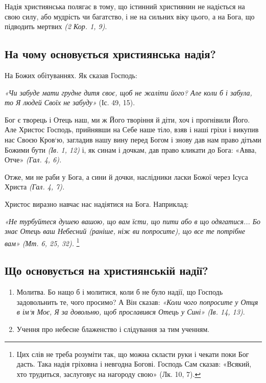 \documentclass[main.tex]{subfiles}
\begin{document}
Надія християнська полягає в тому, що істинний християнин не надіється на свою силу, або мудрість чи багатство, і не на сильних віку цього, а на Бога, що підводить мертвих \emph{(2 Кор. 1, 9)}.
\subsection{На чому основується християнська надія?}
На Божих обітуваннях. Як сказав Господь:

\begin{FlushRight}
    \emph{\color{red}«Чи забуде мати грудне дитя своє, щоб не жаліти його? Але коли б і забула, то Я людей Своїх не забуду»} (Іс. 49, 15).
\end{FlushRight}

Бог є творець і Отець наш, ми ж Його творіння й діти, хоч і прогнівили Його. Але Христос Господь, прийнявши на Себе наше тіло, взяв і наші гріхи і викупив нас Своєю Кров`ю, загладив нашу вину перед Богом і знову дав нам право дітьми Божими бути \emph{(Ів. 1, 12)} і, як синам і дочкам, дав право кликати до Бога: «Авва, Отче» \emph{(Гал. 4, 6).}

Отже, ми не раби у Бога, а сини й дочки, наслідники ласки Божої через Ісуса Христа \emph{(Гал. 4, 7).}

Христос виразно навчає нас надіятися на Бога. Наприклад:

\begin{FlushRight}
   \emph{{\color{red} «Не турбуйтеся душею вашою, що вам їсти, що пити або в що одягатися... Бо знає Отець ваш Небесний} (раніше, ніж ви попросите){\color{red}, що все те потрібне вам»} (Мт. 6, 25, 32).}
   \footnote{Цих слів не треба розуміти так, що можна скласти руки і чекати поки Бог дасть. Така надія гріховна і невгодна Богові. Господь Сам сказав: {\color{red} «Всякий, хто трудиться, заслуговує на нагороду свою»} (Лк. 10, 7).}
\end{FlushRight}


\subsection{Що основується на християнській надії?}
\begin{enumerate}
\item Молитва. Бо нащо б і молитися, коли б не було надії, що Господь задовольнить те, чого просимо? А Він сказав: \emph{{\color{red}«Коли чого попросите у Отця в ім`я Моє, Я за довольню, щоб прославився Отець у Сині»} (Ів. 14, 13)}.
\item Учення про небесне блаженство і слідування за тим ученням.
\end{enumerate}
 
\end{document}
